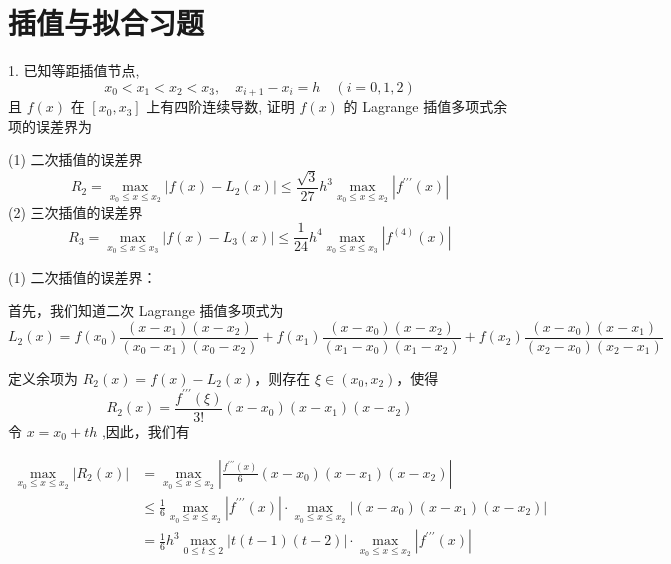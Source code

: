 \section{插值与拟合习题}
\begin{tcolorbox}[breakable,enhanced,arc=0mm,outer arc=0mm,
		boxrule=0pt,toprule=1pt,leftrule=0pt,bottomrule=1pt, rightrule=0pt,left=0.2cm,right=0.2cm,
		titlerule=0.5em,toptitle=0.1cm,bottomtitle=-0.1cm,top=0.2cm,
		colframe=white!10!biru,colback=white!90!biru,coltitle=white,
            coltext=black,title =2024-03-10, title style={white!10!biru}, before skip=8pt, after skip=8pt,before upper=\hspace{2em},
		fonttitle=\bfseries,fontupper=\normalsize]
  
1. 已知等距插值节点,
$$
x_{0}<x_{1}<x_{2}<x_{3}, \quad x_{i+1}-x_{i}=h \quad({i}=0,1,2)
$$
且 $ f(x) $ 在 $ \left[x_{0}, x_{3}\right] $ 上有四阶连续导数, 证明 $ f(x) $ 的 Lagrange 插值多项式余项的误差界为

(1) 二次插值的误差界
$$
R_{2}=\max _{x_{0} \leq x \leq x_{2}}\left|f(x)-L_{2}(x)\right| \leq \frac{\sqrt{3}}{27} h^{3} \max _{x_{0} \leq x \leq x_{2}}\left|f^{\prime \prime \prime}(x)\right|
$$
(2) 三次插值的误差界
$$
R_{3}=\max _{x_{0} \leq x \leq x_{3}}\left|f(x)-L_{3}(x)\right| \leq \frac{1}{24} h^{4} \max _{x_{0} \leq x \leq x_{3}}\left|f^{(4)}(x)\right|
$$
 \tcblower

(1) 二次插值的误差界：

首先，我们知道二次 Lagrange 插值多项式为
$$
L_{2}(x)=f\left(x_{0}\right) \frac{(x-x_{1})(x-x_{2})}{(x_{0}-x_{1})(x_{0}-x_{2})}+f\left(x_{1}\right) \frac{(x-x_{0})(x-x_{2})}{(x_{1}-x_{0})(x_{1}-x_{2})}+f\left(x_{2}\right) \frac{(x-x_{0})(x-x_{1})}{(x_{2}-x_{0})(x_{2}-x_{1})}
$$

定义余项为 $ R_2(x)=f(x)-L_{2}(x) $，则存在 $ \xi \in(x_{0}, x_{2}) $，使得
$$
R_2(x)=\frac{f^{\prime \prime \prime}(\xi)}{3 !}(x-x_{0})(x-x_{1})(x-x_{2})
$$
令 $ x=x_{0}+t h $ ,因此，我们有


$$
\begin{aligned}
\max _{x_{0} \leqslant x \leqslant x_{2}} |R_2(x)| &=\max _{x_{0} \leqslant x \leqslant x_{2}}\left|\frac{f^{\prime \prime \prime}(x)}{6}(x-x_{0})(x-x_{1})(x-x_{2})\right| \\
&\leqslant \frac{1}{6} \max _{x_{0} \leqslant x \leqslant x_{2}}\left|f^{\prime \prime \prime}(x)\right| \cdot \max _{x_{0} \leqslant x \leqslant x_{2}}\left|\left(x-x_{0}\right)\left(x-x_{1}\right)\left(x-x_{2}\right)\right| \\
&=\frac{1}{6} h^{3} \max _{0 \leqslant t \leqslant 2}|t(t-1)(t-2)| \cdot \max _{x_{0} \leqslant x \leqslant x_{2}}\left|f^{\prime \prime \prime}(x)\right| \\
\end{aligned}
$$


\end{tcolorbox}
